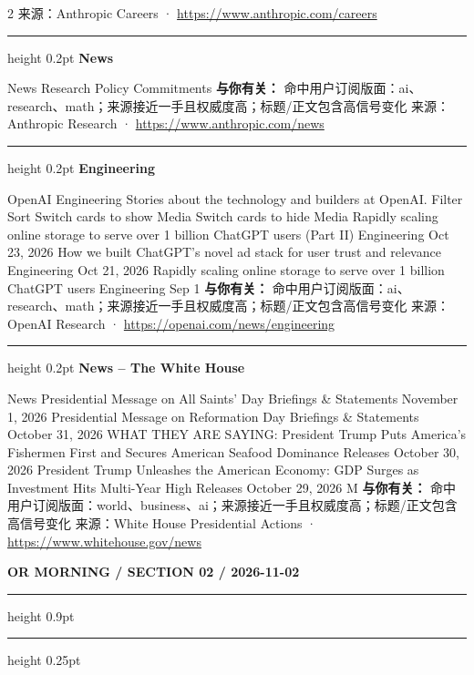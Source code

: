 \documentclass[10.5pt]{ctexart}
\begin{document}
\begin{multicols}{2}
{\footnotesize\color{ormuted} 来源：Anthropic Careers · \url{https://www.anthropic.com/careers}}
\vspace{2mm}
\hrule height 0.2pt
\vspace{2mm}
{\large\bfseries News}\par
News Research Policy Commitments
\textbf{与你有关：} 命中用户订阅版面：ai、research、math；来源接近一手且权威度高；标题/正文包含高信号变化
{\footnotesize\color{ormuted} 来源：Anthropic Research · \url{https://www.anthropic.com/news}}
\vspace{2mm}
\hrule height 0.2pt
\vspace{2mm}
{\large\bfseries Engineering}\par
OpenAI Engineering Stories about the technology and builders at OpenAI. Filter Sort Switch cards to show Media Switch cards to hide Media Rapidly scaling online storage to serve over 1 billion ChatGPT users (Part II) Engineering Oct 23, 2026 How we built ChatGPT’s novel ad stack for user trust and relevance Engineering Oct 21, 2026 Rapidly scaling online storage to serve over 1 billion ChatGPT users Engineering Sep 1
\textbf{与你有关：} 命中用户订阅版面：ai、research、math；来源接近一手且权威度高；标题/正文包含高信号变化
{\footnotesize\color{ormuted} 来源：OpenAI Research · \url{https://openai.com/news/engineering}}
\vspace{2mm}
\hrule height 0.2pt
\vspace{2mm}
{\large\bfseries News – The White House}\par
News Presidential Message on All Saints’ Day Briefings \& Statements November 1, 2026 Presidential Message on Reformation Day Briefings \& Statements October 31, 2026 WHAT THEY ARE SAYING: President Trump Puts America’s Fishermen First and Secures American Seafood Dominance Releases October 30, 2026 President Trump Unleashes the American Economy: GDP Surges as Investment Hits Multi-Year High Releases October 29, 2026 M
\textbf{与你有关：} 命中用户订阅版面：world、business、ai；来源接近一手且权威度高；标题/正文包含高信号变化
{\footnotesize\color{ormuted} 来源：White House Presidential Actions · \url{https://www.whitehouse.gov/news}}
\end{multicols}
\newpage
{\small\bfseries OR MORNING / SECTION 02 / 2026-11-02}
\vspace{2mm}
\hrule height 0.9pt
\vspace{1.5mm}
\hrule height 0.25pt
\vspace{4mm}
\end{document}
